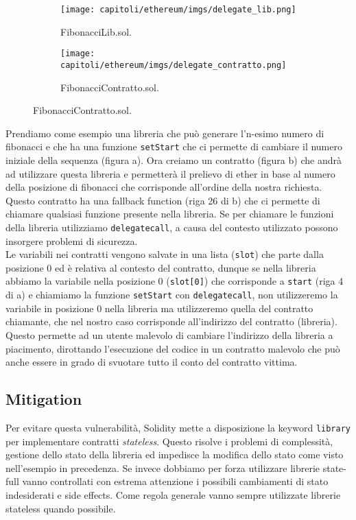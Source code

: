 \begin{figure}[H]
      \centering
      \begin{subfigure}[b]{.5\textwidth}
            \centering
            \texttt{[image: capitoli/ethereum/imgs/delegate\_lib.png]}
            \caption{FibonacciLib.sol.}
      \end{subfigure}%
      \begin{subfigure}[b]{.5\textwidth}
            \centering
            \texttt{[image: capitoli/ethereum/imgs/delegate\_contratto.png]}
            \caption{FibonacciContratto.sol.}
      \end{subfigure}
\end{figure}

Prendiamo come esempio una libreria che può generare l'n-esimo numero di fibonacci
e che ha una funzione \verb|setStart| che ci permette di cambiare il numero
iniziale della sequenza (figura a).
Ora creiamo un contratto (figura b) che andrà ad utilizzare questa libreria e
permetterà il prelievo di ether in base al numero della posizione di fibonacci
che corrisponde all'ordine della nostra richiesta.
Questo contratto ha una fallback function (riga 26 di b)
che ci permette di chiamare qualsiasi funzione presente nella libreria.
Se per chiamare le funzioni della libreria utilizziamo \verb|delegatecall|,
a causa del contesto utilizzato possono insorgere problemi di sicurezza.\\
Le variabili nei contratti vengono salvate in una lista (\verb|slot|)
che parte dalla posizione $0$ ed è relativa al contesto del contratto,
dunque se nella libreria abbiamo la variabile nella posizione $0$ (\verb|slot[0]|)
che corrisponde a \verb|start| (riga 4 di a) e chiamiamo la funzione
\verb|setStart| con \verb|delegatecall|, non utilizzeremo la variabile in
posizione $0$ nella libreria ma utilizzeremo quella del contratto chiamante,
che nel nostro caso corrisponde all'indirizzo del contratto (libreria).
Questo permette ad un utente malevolo di
cambiare l'indirizzo della libreria a piacimento, dirottando l'esecuzione
del codice in un contratto malevolo che può anche essere in grado di svuotare
tutto il conto del contratto vittima.

\subsection{Mitigation}

Per evitare questa vulnerabilità, Solidity mette a disposizione la keyword
\verb|library| per implementare contratti \textit{stateless}.
Questo risolve i problemi di complessità, gestione dello stato della libreria ed
impedisce la modifica dello stato come visto nell'esempio in precedenza.
Se invece dobbiamo per forza utilizzare librerie state-full vanno controllati
con estrema attenzione i possibili cambiamenti di stato indesiderati e side effects.
Come regola generale vanno sempre utilizzate librerie stateless quando possibile.

